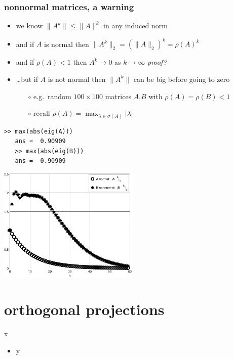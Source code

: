 \documentclass[10pt,hyperref]{beamer}
\begin{document}
\begin{frame}[fragile]
\frametitle{nonnormal matrices, a warning}

\begin{itemize}
\item we know $\|A^k\|\le \|A\|^k$ in any induced norm
\item and if $A$ is normal then $\|A^k\|_2 = (\|A\|_2)^k = \rho(A)^k$
\item and if $\rho(A)<1$ then $A^k \to 0$ as $k\to \infty$ \hfill \emph{proof?}
\item \dots but if $A$ is not normal then $\|A^k\|$ can be big before going to zero
    \begin{itemize}
    \item[$\circ$] e.g.~random $100\times 100$ matrices $A$,$B$ with $\rho(A)=\rho(B)<1$
    \item[$\circ$] recall $\rho(A) = \max_{\lambda\in\sigma(A)} |\lambda|$
    \end{itemize}
\end{itemize}

\bigskip
\begin{Verbatim}[fontsize=\footnotesize]
   >> max(abs(eig(A)))
   ans =  0.90909
   >> max(abs(eig(B)))
   ans =  0.90909
\end{Verbatim}

\vspace{-15mm}
\hfill \includegraphics[width=0.5\textwidth]{figs/normpowers} \quad \phantom{foo}
\end{frame}


\section{orthogonal projections}

\begin{frame}{x}

\begin{itemize}
\item y
\end{itemize}
\end{frame}
\end{document}
